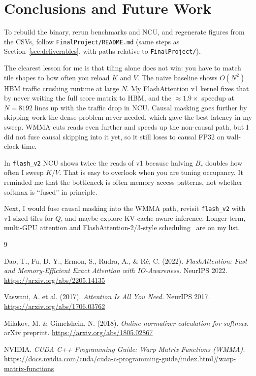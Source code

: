 \documentclass[12pt]{article}
\begin{document}
\section{Conclusions and Future Work}
\label{sec:conclusions}

To rebuild the binary, rerun benchmarks and NCU, and regenerate figures from the CSVs, follow \texttt{FinalProject/README.md} (same steps as Section~\ref{sec:deliverables}, with paths relative to \texttt{FinalProject/}).

The clearest lesson for me is that tiling alone does not win: you have to match tile shapes to how often you reload $K$ and $V$. The naive baseline shows $O(N^2)$ HBM traffic crushing runtime at large $N$. My FlashAttention v1 kernel fixes that by never writing the full score matrix to HBM, and the $\approx 1.9\times$ speedup at $N = 8192$ lines up with the traffic drop in NCU. Causal masking goes further by skipping work the dense problem never needed, which gave the best latency in my sweep. WMMA cuts reads even further and speeds up the non-causal path, but I did not fuse causal skipping into it yet, so it still loses to causal FP32 on wall-clock time.

In \texttt{flash\_v2} NCU shows twice the reads of v1 because halving $B_r$ doubles how often I sweep $K/V$. That is easy to overlook when you are tuning occupancy. It reminded me that the bottleneck is often memory access patterns, not whether softmax is ``fused'' in principle.

Next, I would fuse causal masking into the WMMA path, revisit \texttt{flash\_v2} with v1-sized tiles for $Q$, and maybe explore KV-cache-aware inference. Longer term, multi-GPU attention and FlashAttention-2/3-style scheduling~\cite{dao2022} are on my list.

\begin{thebibliography}{9}

Dao, T., Fu, D. Y., Ermon, S., Rudra, A., \& Ré, C. (2022).
\textit{FlashAttention: Fast and Memory-Efficient Exact Attention with IO-Awareness.}
NeurIPS 2022. \url{https://arxiv.org/abs/2205.14135}

Vaswani, A. et al. (2017).
\textit{Attention Is All You Need.}
NeurIPS 2017. \url{https://arxiv.org/abs/1706.03762}

Milakov, M. \& Gimelshein, N. (2018).
\textit{Online normalizer calculation for softmax.}
arXiv preprint. \url{https://arxiv.org/abs/1805.02867}

NVIDIA.
\textit{CUDA C++ Programming Guide: Warp Matrix Functions (WMMA).}
\url{https://docs.nvidia.com/cuda/cuda-c-programming-guide/index.html#warp-matrix-functions}

\end{thebibliography}
\end{document}
